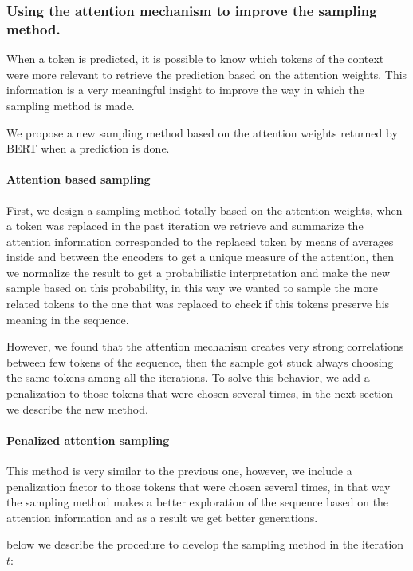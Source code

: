 \documentclass[10pt,twocolumn,letterpaper]{article}
\begin{document}
\subsubsection{Using the attention mechanism to improve the sampling method.}
When a token is predicted, it is possible to know which tokens of the context were more relevant to
retrieve the prediction based on the attention weights.
This information is a very meaningful insight to improve
the way in which the sampling method is made.

We propose a new sampling method based on the attention
weights returned by BERT when a prediction is done.

\paragraph{Attention based sampling}
First, we design a sampling method totally based on the attention weights,
when a token was replaced in the past iteration we retrieve and summarize the
attention information corresponded to the replaced token by means of averages
inside and between the encoders to get a unique measure of the attention, then
we normalize the result to get a probabilistic interpretation and make the new
sample based on this probability, in this way we wanted to sample the more related
tokens to the one that was replaced to check if this tokens preserve his meaning in the sequence.

However, we found that the attention mechanism creates very strong correlations between
few tokens of the sequence, then the sample got stuck always choosing the same tokens among
all the iterations.
To solve this behavior, we add a penalization to those tokens that were
chosen several times, in the next section we describe the new method.

\paragraph{Penalized attention sampling}
This method is very similar to the previous one, however, we include a penalization factor
to those tokens that were chosen several times, in that way the sampling method makes a better
exploration of the sequence based on the attention information and as a result we get better
generations.

below we describe the procedure to develop the sampling method in the iteration $t$:
\end{document}
